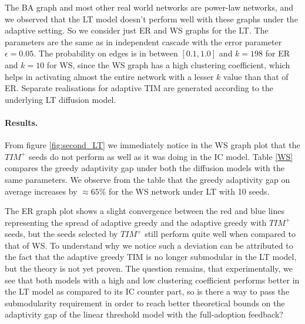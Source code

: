 The BA graph and most other real world networks are power-law networks, and we observed that the LT model doesn't perform well with these graphs under the adaptive setting. So we consider just ER and WS graphs for the LT. The parameters are the same as in independent cascade with the error parameter $\epsilon = 0.05$. The probability on edges is in between $[0.1,1.0]$ and $k=198$ for ER and $k=10$ for WS, since the WS graph has a high clustering coefficient, which helps in activating almost the entire network with a lesser $k$ value than that of ER. Separate realisations for adaptive TIM are generated according to the underlying LT diffusion model.

\paragraph{Results.}

From figure \ref{fig:second_LT} we immediately notice in the WS graph plot that the $TIM^+$ seeds do not perform as well as it was doing in the IC model. Table \ref{WS} compares the greedy adaptivity gap under both the diffusion models with the same parameters. We observe from the table that the greedy adaptivity gap on average increases by $\approx 65\%$ for the WS network under LT with 10 seeds.


The ER graph plot shows a slight convergence between the red and blue lines representing the spread of adaptive greedy and the adaptive greedy with $TIM^+$ seeds, but the seeds selected by $TIM^+$ still perform quite well when compared to that of WS. To understand why we notice such a deviation can be attributed to the fact that the adaptive greedy TIM is no longer submodular in the LT model, but the theory is not yet proven. The question remains, that experimentally, we see that both models with a high and low clustering coefficient performs better in the LT model as compared to its IC counter part, so is there a way to pass the submodularity requirement in order to reach better theoretical bounds on the adaptivity gap of the linear threshold model with the full-adoption feedback?   


